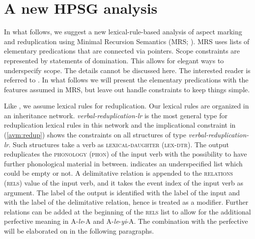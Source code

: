 \section{A new HPSG analysis}\label{sec:analysis}

In what follows, we suggest a new lexical-rule-based analysis of aspect marking and reduplication
using Minimal Recursion Semantics (MRS; \citealt{Copestakeetal2005}). %
MRS uses lists of elementary predications that are connected via pointers. Scope constraints are
represented by statements of domination. This allows for elegant ways to underspecify scope. The
details cannot be discussed here. The interested reader is referred to \citet{Copestakeetal2005}. In
what follows we will present the elementary predications with the features assumed in MRS, but leave
out handle constraints to keep things simple.

Like \citet{FanSongBond2015}, we assume lexical rules for reduplication. Our lexical rules are
organized in an inheritance network. \textit{verbal-reduplication-lr} is the most general type for
reduplication lexical rules in this network and the implicational constraint in (\ref{avm:redup}) shows the constraints on all
structures of type \textit{verbal-reduplication-lr}. Such structures take a verb as
\textsc{lexical-daughter (lex-dtr)}.  The output reduplicates the \textsc{phonology (phon)} of the
input verb with the possibility to have further phonological material in between.  \etag{} indicates
an underspecified list which could be empty or not.  A delimitative relation is appended to the
\textsc{relations (rels)} value of the input verb, and it takes the event index of the input verb as
argument.  The label of the output  is identified with the label of the input and with the
label of the delimitative relation, hence  is treated as a modifier.  Further
relations can be added at the beginning of the \textsc{rels} list to allow for the additional
perfective meaning in A-\textit{le}-A and A-\textit{le}-\textit{yi}-A.  The combination with the
perfective will be elaborated on in the following paragraphs.

\ea
{} \impl\\
\label{avm:redup}
\z

